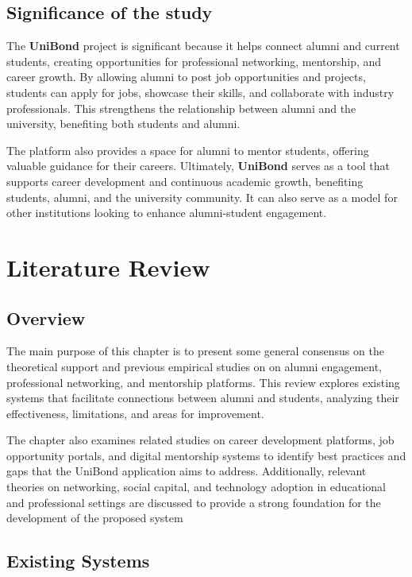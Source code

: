 \documentclass[12pt, a4paper]{report}
\begin{document}
\section{Significance of the study}
The \textbf{UniBond} project is significant because it helps connect alumni and current students, creating opportunities for professional networking, mentorship, and career growth. By allowing alumni to post job opportunities and projects, students can apply for jobs, showcase their skills, and collaborate with industry professionals. This strengthens the relationship between alumni and the university, benefiting both students and alumni.

The platform also provides a space for alumni to mentor students, offering valuable guidance for their careers. Ultimately, \textbf{UniBond} serves as a tool that supports career development and continuous academic growth, benefiting students, alumni, and the university community. It can also serve as a model for other institutions looking to enhance alumni-student engagement.


\newpage

\chapter{Literature Review}

\section{Overview}
The main purpose of this chapter is to present some general consensus on the theoretical support and previous empirical studies on on alumni engagement, professional networking, and mentorship platforms. This review explores existing systems that facilitate connections between alumni and students, analyzing their effectiveness, limitations, and areas for improvement.

The chapter also examines related studies on career development platforms, job opportunity portals, and digital mentorship systems to identify best practices and gaps that the UniBond application aims to address. Additionally, relevant theories on networking, social capital, and technology adoption in educational and professional settings are discussed to provide a strong foundation for the development of the proposed system

\section{Existing Systems}
\end{document}
